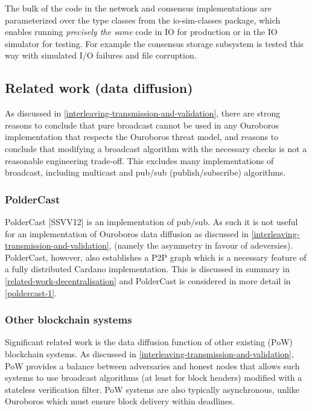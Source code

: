 \documentclass[11pt,a4paper]{article}
\begin{document}
The bulk of the code in the network and consensus implementations are
parameterized over the type classes from the io-sim-classes package,
which enables running \emph{precisely the same} code in IO for
production or in the IO simulator for testing. For example the consensus
storage subsystem is tested this way with simulated I/O failures and
file corruption.

\subsection{Related work (data diffusion)}
\label{related-work-data-diffusion}

As discussed in
\cref{interleaving-transmission-and-validation}, there are strong reasons to conclude that pure broadcast cannot
be used in any Ouroboros implementation that respects the Ouroboros
threat model, and reasons to conclude that modifying a broadcast
algorithm with the necessary checks is not a reasonable engineering
trade-off. This excludes many implementations of broadcast, including
multicast and pub/sub (publish/subscribe) algorithms.

\subsubsection{PolderCast}
\label{poldercast}

PolderCast {[}SSVV12{]} is an implementation of pub/sub. As such it is
not useful for an implementation of Ouroboros data diffusion as
discussed in
\cref{interleaving-transmission-and-validation}, (namely the asymmetry in favour of adeversies). PolderCast,
however, also establishes a P2P graph which is a necessary feature of a
fully distributed Cardano implementation. This is discussed in summary
in \cref{related-work-decentralisation} and PolderCast is considered in
more detail in \cref{poldercast-1}.

\subsubsection{Other blockchain systems}
\label{other-blockchain-systems}

Significant related work is the data diffusion function of other
existing (PoW) blockchain systems. As discussed in
\cref{interleaving-transmission-and-validation}, PoW provides a balance between adversaries and honest nodes
that allows such systems to use broadcast algorithms (at least for block
headers) modified with a stateless verification filter. PoW systems are
also typically asynchronous, unlike Ouroboros which must ensure block
delivery within deadlines.
\end{document}
